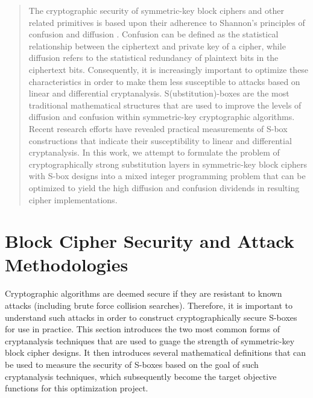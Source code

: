\documentclass[11pt]{article}
\begin{document}


\begin{abstract}
The cryptographic security of symmetric-key block ciphers and other related primitives is based upon their adherence to Shannon's principles of confusion and diffusion \cite{Kim90astudy}. Confusion can be defined as the statistical relationship between the ciphertext and private key of a cipher, while diffusion refers to the statistical redundancy of plaintext bits in the ciphertext bits. Consequently, it is increasingly important to optimize these characteristics in order to make them less susceptible to attacks based on linear and differential cryptanalysis. S(ubstitution)-boxes are the most traditional mathematical structures that are used to improve the levels of diffusion and confusion within symmetric-key cryptographic algorithms. Recent research efforts have revealed practical measurements of S-box constructions that indicate their susceptibility to linear and differential cryptanalysis. In this work, we attempt to formulate the problem of cryptographically strong substitution layers in symmetric-key block ciphers with S-box designs into a mixed integer programming problem that can be optimized to yield the high diffusion and confusion dividends in resulting cipher implementations.
\end{abstract}


\section{Block Cipher Security and Attack Methodologies}

Cryptographic algorithms are deemed secure if they are resistant to known attacks (including brute force collision searches). Therefore, it is important to understand such attacks in order to construct cryptographically secure S-boxes for use in practice. This section introduces the two most common forms of cryptanalysis techniques that are used to guage the strength of symmetric-key block cipher designs. It then introduces several mathematical definitions that can be used to measure the security of S-boxes based on the goal of such cryptanalysis techniques, which subsequently become the target objective functions for this optimization project.
\end{document}
